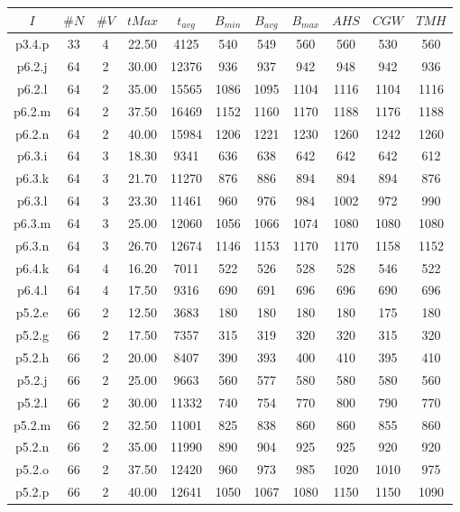 \begin{center}
\begin{tabular}{ |c|c|c|c|c|c|c|c|c|c|c| } 
\hline
$I$ & $\#N$ & $\#V$ & $tMax$ & $t_{avg}$ & $B_{min}$ & $B_{avg}$ & $B_{max}$ & $AHS$ & $CGW$ & $TMH$\\
\hline
p3.4.p & 33 & 4 & 22.50 & 4125 & 540 & 549 & 560 & 560 & 530 & 560  \\
p6.2.j & 64 & 2 & 30.00 & 12376 & 936 & 937 & 942 & 948 & 942 & 936  \\
p6.2.l & 64 & 2 & 35.00 & 15565 & 1086 & 1095 & 1104 & 1116 & 1104 & 1116  \\
p6.2.m & 64 & 2 & 37.50 & 16469 & 1152 & 1160 & 1170 & 1188 & 1176 & 1188  \\
p6.2.n & 64 & 2 & 40.00 & 15984 & 1206 & 1221 & 1230 & 1260 & 1242 & 1260  \\
p6.3.i & 64 & 3 & 18.30 & 9341 & 636 & 638 & 642 & 642 & 642 & 612  \\
p6.3.k & 64 & 3 & 21.70 & 11270 & 876 & 886 & 894 & 894 & 894 & 876  \\
p6.3.l & 64 & 3 & 23.30 & 11461 & 960 & 976 & 984 & 1002 & 972 & 990  \\
p6.3.m & 64 & 3 & 25.00 & 12060 & 1056 & 1066 & 1074 & 1080 & 1080 & 1080  \\
p6.3.n & 64 & 3 & 26.70 & 12674 & 1146 & 1153 & 1170 & 1170 & 1158 & 1152  \\
p6.4.k & 64 & 4 & 16.20 & 7011 & 522 & 526 & 528 & 528 & 546 & 522  \\
p6.4.l & 64 & 4 & 17.50 & 9316 & 690 & 691 & 696 & 696 & 690 & 696  \\
p5.2.e & 66 & 2 & 12.50 & 3683 & 180 & 180 & 180 & 180 & 175 & 180  \\
p5.2.g & 66 & 2 & 17.50 & 7357 & 315 & 319 & 320 & 320 & 315 & 320  \\
p5.2.h & 66 & 2 & 20.00 & 8407 & 390 & 393 & 400 & 410 & 395 & 410  \\
p5.2.j & 66 & 2 & 25.00 & 9663 & 560 & 577 & 580 & 580 & 580 & 560  \\
p5.2.l & 66 & 2 & 30.00 & 11332 & 740 & 754 & 770 & 800 & 790 & 770  \\
p5.2.m & 66 & 2 & 32.50 & 11001 & 825 & 838 & 860 & 860 & 855 & 860  \\
p5.2.n & 66 & 2 & 35.00 & 11990 & 890 & 904 & 925 & 925 & 920 & 920  \\
p5.2.o & 66 & 2 & 37.50 & 12420 & 960 & 973 & 985 & 1020 & 1010 & 975  \\
p5.2.p & 66 & 2 & 40.00 & 12641 & 1050 & 1067 & 1080 & 1150 & 1150 & 1090  \\

\end{tabular}
\end{center}
